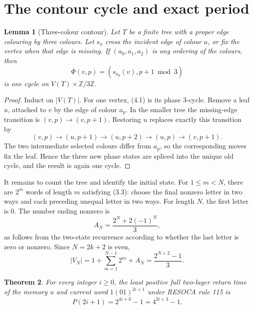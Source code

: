 \documentclass[11pt]{amsart}
\newtheorem{theorem}{Theorem}[section]
\newtheorem{lemma}[theorem]{Lemma}
\theoremstyle{definition}
\begin{document}
\section{The contour cycle and exact period}

\begin{lemma}[Three-colour contour]\label{lem:contour}
Let \(T\) be a finite tree with a proper edge colouring by three colours.  Let
\(s_a\) cross the incident edge of colour \(a\), or fix the vertex when that
edge is missing.  If \((a_0,a_1,a_2)\) is any ordering of the colours, then
\[
\Phi(v,p)=(s_{a_p}(v),p+1\bmod3)                      \tag{4.1}
\]
is one cycle on \(V(T)\times\mathbb Z/3\mathbb Z\).
\end{lemma}

\begin{proof}
Induct on \(|V(T)|\).  For one vertex, (4.1) is its phase 3-cycle.  Remove a
leaf \(u\), attached to \(v\) by the edge of colour \(a_p\).  In the smaller
tree the missing-edge transition is
\((v,p)\to(v,p+1)\).  Restoring \(u\) replaces exactly this transition by
\[
(v,p)\to(u,p+1)\to(u,p+2)\to(u,p)\to(v,p+1).          \tag{4.2}
\]
The two intermediate selected colours differ from \(a_p\), so the
corresponding moves fix the leaf.  Hence the three new phase states are
spliced into the unique old cycle, and the result is again one cycle.
\end{proof}

It remains to count the tree and identify the initial state.  For
\(1\leq m<N\), there are \(2^m\) words of length \(m\) satisfying (3.3):
choose the final nonzero letter in two ways and each preceding unequal letter
in two ways.  For length \(N\), the first letter is 0.  The number ending
nonzero is
\[
A_N=\frac{2^N+2{(-1)}^N}{3},                           \tag{4.3}
\]
as follows from the two-state recurrence according to whether the last letter
is zero or nonzero.  Since \(N=2k+2\) is even,
\[
|V_N|=1+\sum_{m=1}^{N-1}2^m+A_N
=\frac{2^{N+2}-1}{3}.                                 \tag{4.4}
\]

\begin{theorem}\label{thm:main}
For every integer \(i\geq0\), the least positive full two-layer return time of
the memory \(u\) and current word \(1{(01)}^{2i+1}\) under RESOCA rule 115 is
\[
P(2i+1)=2^{4i+6}-1=4^{2i+3}-1.
\]
\end{theorem}
\end{document}
